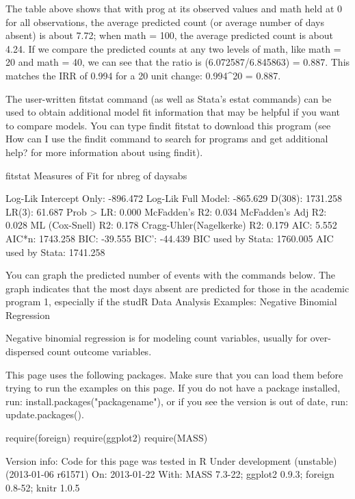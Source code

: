 The table above shows that with prog at its observed values and math held at 0 for all observations, the average predicted count (or average number of days absent) is about 7.72; when math = 100, the average predicted count is about 4.24. If we compare the predicted counts at any two levels of math, like math = 20 and math = 40, we can see that the ratio is (6.072587/6.845863) = 0.887. This matches the IRR of 0.994 for a 20 unit change: 0.994^20 = 0.887.

The user-written fitstat command (as well as Stata's estat commands) can be used to obtain additional model fit information that may be helpful if you want to compare models.  You can type findit fitstat to download this program (see How can I use the findit command to search for programs and get additional help? for more information about using findit).

fitstat
Measures of Fit for nbreg of daysabs

Log-Lik Intercept Only:       -896.472   Log-Lik Full Model:           -865.629
D(308):                       1731.258   LR(3):                          61.687
Prob > LR:                       0.000
McFadden's R2:                   0.034   McFadden's Adj R2:               0.028
ML (Cox-Snell) R2:               0.178   Cragg-Uhler(Nagelkerke) R2:      0.179
AIC:                             5.552   AIC*n:                        1743.258
BIC:                           -39.555   BIC':                          -44.439
BIC used by Stata:            1760.005   AIC used by Stata:            1741.258

You can graph the predicted number of events with the commands below.  The graph indicates that the most days absent are predicted for those in the academic program 1, especially if the studR Data Analysis Examples: Negative Binomial Regression

Negative binomial regression is for modeling count variables, usually for over-dispersed count outcome variables.

This page uses the following packages. Make sure that you can load them before trying to run the examples on this page. If you do not have a package installed, run: install.packages("packagename"), or if you see the version is out of date, run: update.packages().



require(foreign)
require(ggplot2)
require(MASS)

Version info: Code for this page was tested in R Under development (unstable) (2013-01-06 r61571)
On: 2013-01-22
With: MASS 7.3-22; ggplot2 0.9.3; foreign 0.8-52; knitr 1.0.5 

